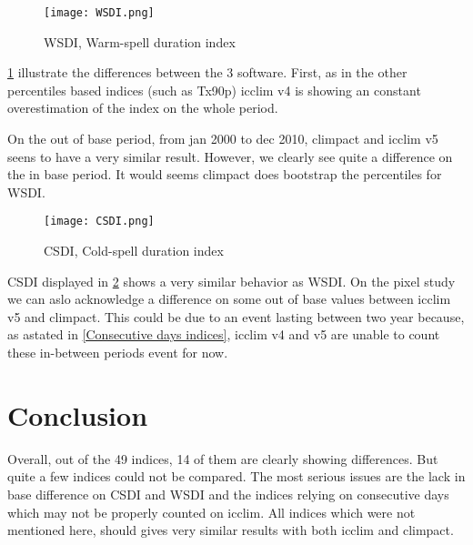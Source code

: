 \documentclass[a4paper,11pt]{article}
\begin{document}
    \begin{figure}[!hbt]
        \centering
        \texttt{[image: WSDI.png]}
        \caption{WSDI, Warm-spell duration index}
        \label{figure/wsdi}
    \end{figure}
    
    \ref{figure/wsdi} illustrate the differences between the 3 software.
    First, as in the other percentiles based indices (such as Tx90p) icclim v4 is showing an constant overestimation of the index on the whole period.

    On the out of base period, from jan 2000 to dec 2010, climpact and icclim v5 seens to have a very similar result.
    However, we clearly see quite a difference on the in base period. It would seems climpact does bootstrap the percentiles for WSDI.
   
    \begin{figure}[!hbt]
        \centering
        \texttt{[image: CSDI.png]}
        \caption{CSDI, Cold-spell duration index}
        \label{figure/csdi}
    \end{figure}

    CSDI displayed in \ref{figure/csdi} shows a very similar behavior as WSDI.
    On the pixel study we can aslo acknowledge a difference on some out of base values between icclim v5 and climpact. This could be due to an event lasting between two year because, as astated in \ref{Consecutive days indices}, icclim v4 and v5 are unable to count these in-between periods event for now.
 
    
\part{Conclusion}
    Overall, out of the 49 indices, 14 of them are clearly showing differences.
    But quite a few indices could not be compared.
    The most serious issues are the lack in base difference on CSDI and WSDI and the indices relying on consecutive days which may not be properly counted on icclim.
    All indices which were not mentioned here, should gives very similar results with both icclim and climpact.

\end{document}
